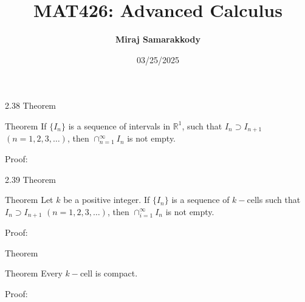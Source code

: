 \documentclass{beamer}
\title{MAT426: Advanced Calculus}
\author{\textbf{Miraj Samarakkody}}
\institute{Tougaloo College}
\date{03/25/2025}
\begin{document}
\begin{frame}
    \titlepage
\end{frame}



\begin{frame}{2.38 Theorem}
\begin{block}{Theorem}
If \(\{I_n\}\) is a sequence of intervals in \(\mathbb{R}^1\), such that \(I_n \supset I_{n+1}\) \((n=1,2,3,\dots)\), then \(\cap_{n=1}^\infty I_n\) is not empty. 
\end{block}
\begin{block}{Proof:}

\end{block}
\end{frame}

\begin{frame}{2.39 Theorem}
\begin{block}{Theorem}
Let \(k\) be a positive integer. If \(\{I_n\}\) is a sequence of \(k-\)cells such that \(I_n \supset I_{n+1}\) \((n=1,2,3,\dots)\), then \(\cap_{i=1}^\infty I_n\) is not empty. 
\end{block}
\begin{block}{Proof:}

\end{block}
\end{frame}

\begin{frame}{Theorem}
\begin{block}{Theorem}
Every \(k-\)cell is compact.
\end{block}
\begin{block}{Proof:}

\end{block}
\end{frame}
\end{document}
